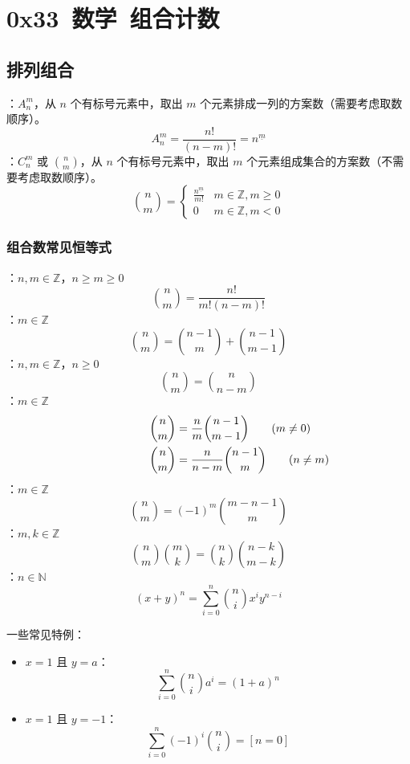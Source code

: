 \section{0x33\ 数学\ 组合计数}
\label{sec:0x33}

\subsection{排列组合}

：$A_{n}^m$，从 $n$ 个有标号元素中，取出 $m$ 个元素排成一列的方案数（需要考虑取数顺序）。
\[
A_n^m = \frac{n!}{(n - m)!} = n^{\underline{m}}
\]
：$C_n^m$ 或 $\binom{n}{m}$，从 $n$ 个有标号元素中，取出 $m$ 个元素组成集合的方案数（不需要考虑取数顺序）。
\[
\binom{n}{m} = \begin{cases}
\frac{n^{\underline{m}}}{m!} & m \in \mathbb{Z}, m \geq 0 \\
0 & m \in \mathbb{Z}, m < 0
\end{cases}
\]

\subsubsection{组合数常见恒等式}

：$n, m \in \mathbb{Z}$，$n \geq m \geq 0$
\[
\binom{n}{m} = \frac{n!}{m!(n - m)!}
\]
：$m \in \mathbb{Z}$
\[
\binom{n}{m} = \binom{n - 1}{m} + \binom{n - 1}{m - 1}
\]
：$n, m \in \mathbb{Z}$，$n \geq 0$
\[
\binom{n}{m} = \binom{n}{n - m}
\]
：$m \in \mathbb{Z}$
\[
\begin{aligned}
\binom{n}{m} & = \frac{n}{m}\binom{n - 1}{m - 1}
  \rlap{$\qquad (m \neq 0)$} \\
\binom{n}{m} & = \frac{n}{n - m}\binom{n - 1}{m}
  \rlap{$\qquad (n \neq m)$}
\end{aligned}
\]
：$m \in \mathbb{Z}$
\[
\binom{n}{m} = (-1)^m \binom{m - n - 1}{m}
\]
：$m, k \in \mathbb{Z}$
\[
\binom{n}{m}\binom{m}{k} = \binom{n}{k}\binom{n - k}{m - k}
\]
：$n \in \mathbb{N}$
\[
(x + y)^n = \sum_{i = 0}^n \binom{n}{i}x^{i}y^{n - i}
\]

\begin{quoteblock}
一些常见特例：

\begin{itemize}
    \item $x = 1$ 且 $y = a$：
    \[
    \sum_{i = 0}^{n} \binom{n}{i}a^i = (1 + a)^n
    \]

    \item $x = 1$ 且 $y = -1$：
    \[
    \sum_{i = 0}^n (-1)^i \binom{n}{i} = [n = 0]
    \]
\end{itemize}
\end{quoteblock}

